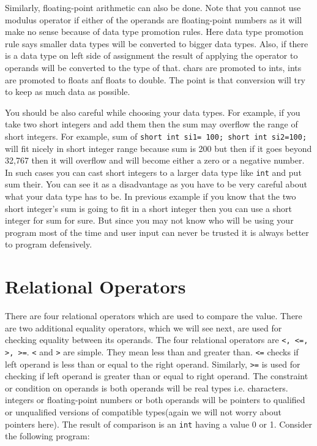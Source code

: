Similarly, floating-point arithmetic can also be done.
Note that you cannot use modulus operator if either of the operands are
floating-point numbers as it will make no sense because of data type promotion
rules. Here data type promotion rule says smaller data types will be converted
to bigger data types. Also, if there is a data type on left side of assignment
the result of applying the operator to operands will be converted to the type
of that. chars are promoted to ints, ints are promoted to floats anf floats to
double. The point is that conversion will try to keep as much data as
possible. 

You should be also careful while choosing your data types. For example, if you
take two short integers and add them then the sum may overflow the range of
short integers. For example, sum of \texttt{short int si1= 100; short int
  si2=100;} will fit nicely in short integer range because sum is 200 but then
if it goes beyond 32,767 then it will overflow and will become either a zero or
a negative number. In such cases you can cast short integers to a larger data
type like \texttt{int} and put sum their. You can see it as a disadvantage as
you have to be very careful about what your data type has to be. In previous
example if you know that the two short integer's sum is going to fit in a short
integer then you can use a short integer for sum for sure. But since you may
not know who will be using your program most of the time and user input can
never be trusted it is always better to program defensively.

\section{Relational Operators}
There are four relational operators which are used to compare the value. There 
are two additional equality operators, which we will see next, are used for 
checking equality between its operands. The four relational operators are 
\texttt{<, <=, >, >=}. \texttt{<} and \texttt{>} are simple. They mean less 
than and greater than. \texttt{<=} checks if left operand is less than or equal 
to the right operand. Similarly, \texttt{>=} is used for checking if left 
operand is greater than or equal to right operand. The constraint or condition 
on operands is both operands will be real types i.e. characters. integers or 
floating-point numbers or both operands will be pointers to qualified or 
unqualified versions of compatible types(again we will not worry about pointers 
here). The result of comparison is an \texttt{int} having a value 0 or 1. 
Consider the following program:

